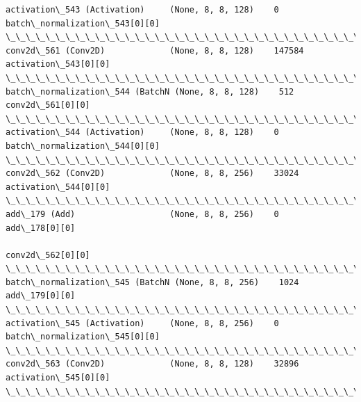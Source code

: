 \documentclass[11pt]{article}
\begin{document}
\begin{Verbatim}[commandchars=\\\{\}]
activation\_543 (Activation)     (None, 8, 8, 128)    0           batch\_normalization\_543[0][0]    
\_\_\_\_\_\_\_\_\_\_\_\_\_\_\_\_\_\_\_\_\_\_\_\_\_\_\_\_\_\_\_\_\_\_\_\_\_\_\_\_\_\_\_\_\_\_\_\_\_\_\_\_\_\_\_\_\_\_\_\_\_\_\_\_\_\_\_\_\_\_\_\_\_\_\_\_\_\_\_\_\_\_\_\_\_\_\_\_\_\_\_\_\_\_\_\_\_\_
conv2d\_561 (Conv2D)             (None, 8, 8, 128)    147584      activation\_543[0][0]             
\_\_\_\_\_\_\_\_\_\_\_\_\_\_\_\_\_\_\_\_\_\_\_\_\_\_\_\_\_\_\_\_\_\_\_\_\_\_\_\_\_\_\_\_\_\_\_\_\_\_\_\_\_\_\_\_\_\_\_\_\_\_\_\_\_\_\_\_\_\_\_\_\_\_\_\_\_\_\_\_\_\_\_\_\_\_\_\_\_\_\_\_\_\_\_\_\_\_
batch\_normalization\_544 (BatchN (None, 8, 8, 128)    512         conv2d\_561[0][0]                 
\_\_\_\_\_\_\_\_\_\_\_\_\_\_\_\_\_\_\_\_\_\_\_\_\_\_\_\_\_\_\_\_\_\_\_\_\_\_\_\_\_\_\_\_\_\_\_\_\_\_\_\_\_\_\_\_\_\_\_\_\_\_\_\_\_\_\_\_\_\_\_\_\_\_\_\_\_\_\_\_\_\_\_\_\_\_\_\_\_\_\_\_\_\_\_\_\_\_
activation\_544 (Activation)     (None, 8, 8, 128)    0           batch\_normalization\_544[0][0]    
\_\_\_\_\_\_\_\_\_\_\_\_\_\_\_\_\_\_\_\_\_\_\_\_\_\_\_\_\_\_\_\_\_\_\_\_\_\_\_\_\_\_\_\_\_\_\_\_\_\_\_\_\_\_\_\_\_\_\_\_\_\_\_\_\_\_\_\_\_\_\_\_\_\_\_\_\_\_\_\_\_\_\_\_\_\_\_\_\_\_\_\_\_\_\_\_\_\_
conv2d\_562 (Conv2D)             (None, 8, 8, 256)    33024       activation\_544[0][0]             
\_\_\_\_\_\_\_\_\_\_\_\_\_\_\_\_\_\_\_\_\_\_\_\_\_\_\_\_\_\_\_\_\_\_\_\_\_\_\_\_\_\_\_\_\_\_\_\_\_\_\_\_\_\_\_\_\_\_\_\_\_\_\_\_\_\_\_\_\_\_\_\_\_\_\_\_\_\_\_\_\_\_\_\_\_\_\_\_\_\_\_\_\_\_\_\_\_\_
add\_179 (Add)                   (None, 8, 8, 256)    0           add\_178[0][0]                    
                                                                 conv2d\_562[0][0]                 
\_\_\_\_\_\_\_\_\_\_\_\_\_\_\_\_\_\_\_\_\_\_\_\_\_\_\_\_\_\_\_\_\_\_\_\_\_\_\_\_\_\_\_\_\_\_\_\_\_\_\_\_\_\_\_\_\_\_\_\_\_\_\_\_\_\_\_\_\_\_\_\_\_\_\_\_\_\_\_\_\_\_\_\_\_\_\_\_\_\_\_\_\_\_\_\_\_\_
batch\_normalization\_545 (BatchN (None, 8, 8, 256)    1024        add\_179[0][0]                    
\_\_\_\_\_\_\_\_\_\_\_\_\_\_\_\_\_\_\_\_\_\_\_\_\_\_\_\_\_\_\_\_\_\_\_\_\_\_\_\_\_\_\_\_\_\_\_\_\_\_\_\_\_\_\_\_\_\_\_\_\_\_\_\_\_\_\_\_\_\_\_\_\_\_\_\_\_\_\_\_\_\_\_\_\_\_\_\_\_\_\_\_\_\_\_\_\_\_
activation\_545 (Activation)     (None, 8, 8, 256)    0           batch\_normalization\_545[0][0]    
\_\_\_\_\_\_\_\_\_\_\_\_\_\_\_\_\_\_\_\_\_\_\_\_\_\_\_\_\_\_\_\_\_\_\_\_\_\_\_\_\_\_\_\_\_\_\_\_\_\_\_\_\_\_\_\_\_\_\_\_\_\_\_\_\_\_\_\_\_\_\_\_\_\_\_\_\_\_\_\_\_\_\_\_\_\_\_\_\_\_\_\_\_\_\_\_\_\_
conv2d\_563 (Conv2D)             (None, 8, 8, 128)    32896       activation\_545[0][0]             
\_\_\_\_\_\_\_\_\_\_\_\_\_\_\_\_\_\_\_\_\_\_\_\_\_\_\_\_\_\_\_\_\_\_\_\_\_\_\_\_\_\_\_\_\_\_\_\_\_\_\_\_\_\_\_\_\_\_\_\_\_\_\_\_\_\_\_\_\_\_\_\_\_\_\_\_\_\_\_\_\_\_\_\_\_\_\_\_\_\_\_\_\_\_\_\_\_\_

\end{Verbatim}
\end{document}

